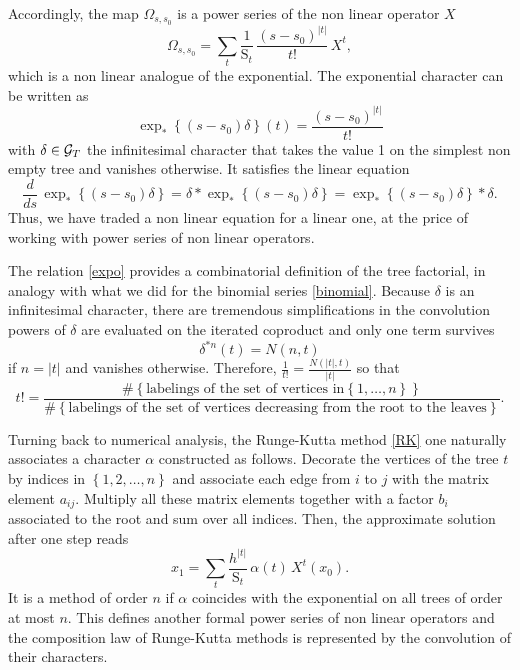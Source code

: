 \documentclass[10pt,here,feynmf]{article}
\begin{document}
Accordingly, the map $\Omega_{s,s_{0}}$ is a power series of the non linear operator $X$
\begin{equation}
\Omega_{s,s_{0}}=\sum_{t}\frac{1}{\mathrm{S}_{t}}\,\frac{ (s-s_{0})^{|t|}}{t!}\,X^{t},
\end{equation}
which is a non linear analogue of the exponential. The exponential character can be written as 
\begin{equation}
\exp_{\ast}\left\{(s-s_{0})\delta\right\}(t)=\frac{(s-s_{0})^{|t|}}{t!}\label{expo}
\end{equation}
with $\delta\in{\cal G}_{T}$ the infinitesimal character that takes the value 1 on the simplest non empty tree and vanishes otherwise. It satisfies the linear equation
\begin{equation}
\frac{d}{ds}\,\exp_{\ast}\left\{(s-s_{0})\delta\right\}=\delta\ast \exp_{\ast}\left\{(s-s_{0})\delta\right\}=\exp_{\ast}\left\{(s-s_{0})\delta\right\}\ast\delta.
\end{equation}
Thus, we have traded a non linear equation for a linear one, at the price of working with power series of non linear operators. 

The relation \eqref{expo} provides a combinatorial definition of the tree factorial, in analogy with what we did for the binomial series \eqref{binomial}. Because $\delta$ is an infinitesimal character, there are tremendous simplifications in the convolution powers of $\delta$ are evaluated on the iterated coproduct and only one term survives
\begin{equation}
\delta^{\ast n}(t)=N(n,t)
\end{equation}
if $n=|t|$ and vanishes otherwise. Therefore, $\frac{1}{t!}=\frac{N(|t|,t)}{|t|}$ so that
\begin{equation}
t!=\frac{\#\left\{ \mbox{labelings of the set of vertices in}\left\{1,\dots,n\right\} \right\}}
{\#\left\{ \mbox{labelings of the set of vertices decreasing from the root to the leaves} \right\}}.
\label{combifac}
\end{equation}

Turning back to numerical analysis, the Runge-Kutta method \eqref{RK} one naturally associates a  character $\alpha$ constructed as follows. 
Decorate the vertices of the tree $t$ by indices in $\left\{1,2,\dots,n\right\}$ and associate each edge from $i$ to $j$ with the matrix element $a_{ij}$. Multiply all these matrix elements together with a factor $b_{i}$ associated to the root and sum over all indices. Then, the approximate solution after one step reads 
\begin{equation}
x_{1}=\sum_{t}\frac{h^{|t|}}{{\mathrm S}_{t}}\,\alpha(t)\,X^{t}(x_{0}).
\end{equation}
It is a method of order $n$ if $\alpha$ coincides with the exponential on all trees of order at most $n$. This defines another formal power series of non linear operators and the composition law of Runge-Kutta methods is represented by the convolution of their characters.
\end{document}
